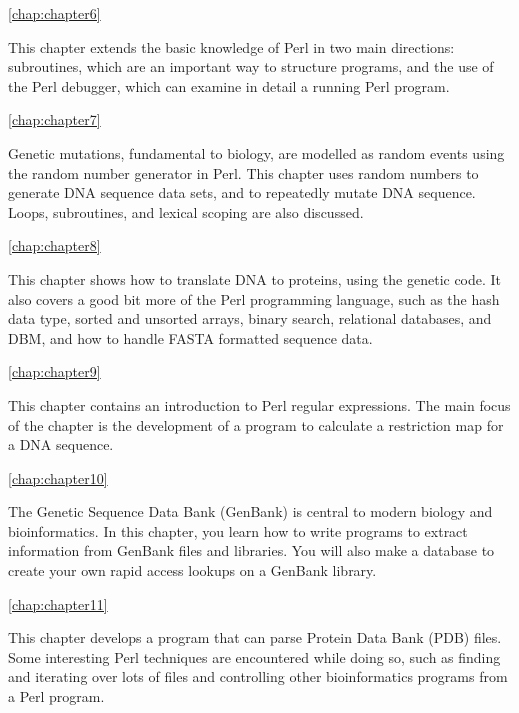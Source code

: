 \autoref{chap:chapter6}
\begin{adjustwidth}{1cm}{0cm}
This chapter extends the basic knowledge of Perl in two main directions: subroutines, which are an important way to structure programs, and the use of the Perl debugger, which can examine in detail a running Perl program.
\end{adjustwidth}

\autoref{chap:chapter7}
\begin{adjustwidth}{1cm}{0cm}
Genetic mutations, fundamental to biology, are modelled as random events using the random number generator in Perl. This chapter uses random numbers to generate DNA sequence data sets, and to repeatedly mutate DNA sequence. Loops, subroutines, and lexical scoping are also discussed.
\end{adjustwidth}

\autoref{chap:chapter8}
\begin{adjustwidth}{1cm}{0cm}
This chapter shows how to translate DNA to proteins, using the genetic code. It also covers a good bit more of the Perl programming language, such as the hash data type, sorted and unsorted arrays, binary search, relational databases, and DBM, and how to handle FASTA formatted sequence data.
\end{adjustwidth}

\autoref{chap:chapter9}
\begin{adjustwidth}{1cm}{0cm}
This chapter contains an introduction to Perl regular expressions. The main focus of the chapter is the development of a program to calculate a restriction map for a DNA sequence.
\end{adjustwidth}

\autoref{chap:chapter10}
\begin{adjustwidth}{1cm}{0cm}
The Genetic Sequence Data Bank (GenBank) is central to modern biology and bioinformatics. In this chapter, you learn how to write programs to extract information from GenBank files and libraries. You will also make a database to create your own rapid access lookups on a GenBank library.
\end{adjustwidth}

\autoref{chap:chapter11}
\begin{adjustwidth}{1cm}{0cm}
This chapter develops a program that can parse Protein Data Bank (PDB) files. Some interesting Perl techniques are encountered while doing so, such as finding and iterating over lots of files and controlling other bioinformatics programs from a Perl program.
\end{adjustwidth}

